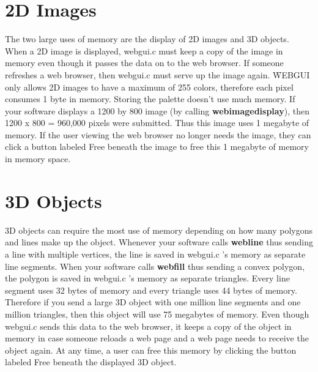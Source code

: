 \section{2D Images}
The two large uses of memory are the display of 2D images and 3D objects. When a 2D image is displayed, webgui.c must keep a copy
of the image in memory even though it passes the data on to the web browser. If someone refreshes a web browser, then webgui.c must
serve up the image again. \f{WEBGUI} only allows 2D images to have a maximum of 255 colors, therefore each pixel consumes 1 byte in 
memory. Storing the palette doesn't use much memory. If your software displays a 1200 by 800 image (by calling \textbf{webimagedisplay}), 
then  1200 x 800 = 960,000 pixels were submitted. Thus this image uses
1 megabyte of memory. If the user viewing the web browser no longer needs the image, they can click a button labeled Free beneath the image
to free this 1 megabyte of memory in memory space.

\section{3D Objects}
\label{sec:5-2}
3D objects can require the most use of memory depending on how many polygons and lines make up the object. Whenever your software
calls \textbf{webline} thus sending a line with multiple vertices, the line is saved in webgui.c 's memory as separate line segments. 
When your software calls \textbf{webfill} thus sending a convex
polygon, the polygon is saved in webgui.c 's memory as separate triangles. Every line segment uses 32 bytes of memory and every triangle
uses 44 bytes of memory. Therefore if you send a large 3D object with one million line segments and one million triangles, then this object
will use 75 megabytes of memory. Even though webgui.c sends this data to the web browser, it keeps a copy of the object in memory in case
someone reloads a web page and a web page needs to receive the object again. At any time, a user can free this memory by clicking the
button labeled Free beneath the displayed 3D object.


